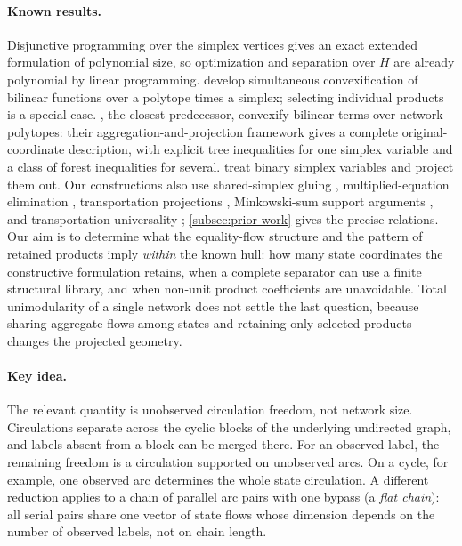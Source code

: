 \paragraph{Known results.}
Disjunctive programming \citep{Balas1998} over the simplex vertices gives
an exact extended formulation of polynomial size, so optimization and
separation over $H$ are already polynomial by linear programming. \citet{DavarniaRichardTawarmalani2017} develop
simultaneous convexification of bilinear functions over a polytope times a
simplex; selecting individual products is a special case.
\citet{KhademniaDavarnia2025}, the closest predecessor, convexify bilinear
terms over network polytopes: their aggregation-and-projection framework
gives a complete original-coordinate description, with explicit tree
inequalities for one simplex variable and a class of forest inequalities for
several. \citet{DavarniaRahimian2026} treat binary simplex variables and
project them out. Our constructions also use shared-simplex gluing
\citep{Davarnia2016}, multiplied-equation elimination
\citep{LibertiPantelides2006}, transportation projections
\citep{KisHorvath2022}, Minkowski-sum support arguments
\citep{GritzmannSturmfels1993,OnnRothblum2004}, and transportation
universality \citep{DeLoeraOnn2006}; \cref{subsec:prior-work} gives the
precise relations. Our aim is to determine what the equality-flow structure
and the pattern of retained products imply \emph{within} the known hull: how
many state coordinates the constructive formulation retains, when a complete separator can use a finite structural library, and
when non-unit product coefficients are unavoidable. Total unimodularity of a
single network does not settle the last question, because sharing aggregate
flows among states and retaining only selected products changes the
projected geometry.

\paragraph{Key idea.}
The relevant quantity is unobserved circulation freedom, not network size.
Circulations separate across the cyclic blocks of the underlying undirected
graph, and labels absent from a block can be merged there. For an observed
label, the remaining freedom is a circulation supported on unobserved arcs.
On a cycle, for example, one observed arc determines the whole state
circulation. A different reduction applies to a chain of parallel arc pairs
with one bypass (a \emph{flat chain}): all serial pairs share one vector of state flows whose
dimension depends on the number of observed labels, not on chain length.

